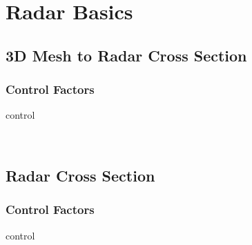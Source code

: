 % 

\section{Radar Basics}

\subsection{3D Mesh to Radar Cross Section}
%
\begin{frame}\frametitle{Control Factors}
\begin{overpic}[ scale = 0.325 ]
		{\pLocalGraphics control}
	\end{overpic}
	\ \\
	\cite{cite-trcs}
\end{frame}

\subsection{Radar Cross Section}
%
\begin{frame}\frametitle{Control Factors}
\begin{overpic}[ scale = 0.325 ]
		{\pLocalGraphics control}
	\end{overpic}
	\ \\
	\cite{cite-trcs}
\end{frame}
%

\endinput  %
